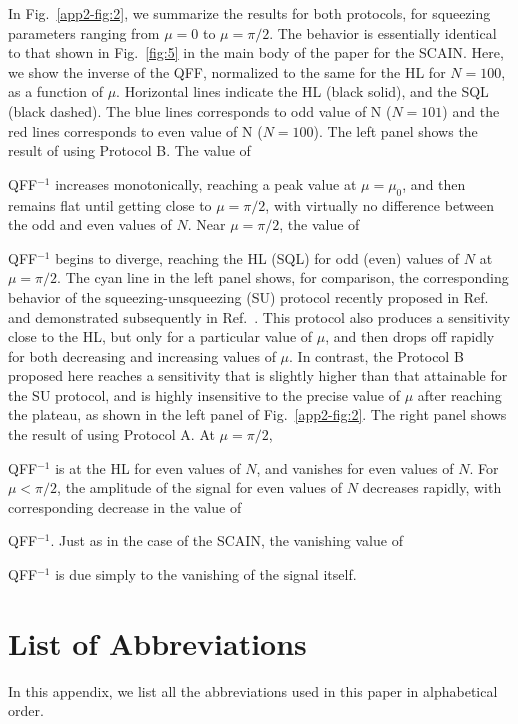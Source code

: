 \documentclass[aps,pra,letterpaper,superscriptaddress,showpacs,amsmath,floats,twocolumn]{revtex4-1}
\begin{document}
In Fig.~\ref{app2-fig:2}, we summarize the results for both protocols, for squeezing parameters ranging from $\mu=0$ to $\mu=\pi/2$. The behavior is essentially identical to that shown in Fig.~\ref{fig:5} in the main body of the paper for the SCAIN. Here, we show the inverse of the QFF, normalized to the same for the HL for $N=100$, as a function of $\mu$. Horizontal lines indicate the HL (black solid), and the SQL (black dashed). The blue lines corresponds to odd value of N ($N=101$) and the red lines corresponds to even value of N ($N=100$). The left panel shows the result of using Protocol B. The value of {QFF$^{-1}$ increases monotonically, reaching a peak value at $\mu=\mu_0$, and then remains flat until getting close to $\mu=\pi/2$, with virtually no difference between the odd and even values of $N$. Near $\mu=\pi/2$, the value of {QFF$^{-1}$ begins to diverge, reaching the HL (SQL) for odd (even) values of $N$ at $\mu=\pi/2$. The cyan line in the left panel shows, for comparison, the corresponding behavior of the squeezing-unsqueezing (SU) protocol recently proposed in Ref.~\cite{Antisqz} and demonstrated subsequently in Ref.~\cite{Antisqzexpt}. This protocol also produces a sensitivity close to the HL, but only for a particular value of $\mu$, and then drops off rapidly for both decreasing and increasing values of $\mu$. In contrast, the Protocol B proposed here reaches a sensitivity that is slightly higher than that attainable for the SU protocol, and is highly insensitive to the precise value of $\mu$ after reaching the plateau, as shown in the left panel of Fig.~\ref{app2-fig:2}. The right panel shows the result of using Protocol A. At $\mu=\pi/2$, {QFF$^{-1}$ is at the HL for even values of $N$, and vanishes for even values of $N$. For $\mu < \pi/2$, the amplitude of the signal for even values of $N$ decreases rapidly, with corresponding decrease in the value of {QFF$^{-1}$. Just as in the case of the SCAIN, the vanishing value of {QFF$^{-1}$ is due simply to the vanishing of the signal itself.

\section{List of Abbreviations}
In this appendix, we list all the abbreviations used in this paper in alphabetical order.

}}}}}
\end{document}
